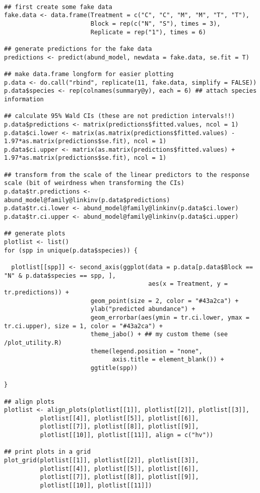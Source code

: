 \documentclass[11pt]{article}
\begin{document}
\begin{verbatim}

## first create some fake data
fake.data <- data.frame(Treatment = c("C", "C", "M", "M", "T", "T"),
                        Block = rep(c("N", "S"), times = 3),
                        Replicate = rep("1"), times = 6)

## generate predictions for the fake data
predictions <- predict(abund_model, newdata = fake.data, se.fit = T)

## make data.frame longform for easier plotting
p.data <- do.call("rbind", replicate(11, fake.data, simplify = FALSE))
p.data$species <- rep(colnames(summary@y), each = 6) ## attach species information

## calculate 95% Wald CIs (these are not prediction intervals!!)
p.data$predictions <- matrix(predictions$fitted.values, ncol = 1)
p.data$ci.lower <- matrix(as.matrix(predictions$fitted.values) - 1.97*as.matrix(predictions$se.fit), ncol = 1)
p.data$ci.upper <- matrix(as.matrix(predictions$fitted.values) + 1.97*as.matrix(predictions$se.fit), ncol = 1)

## transform from the scale of the linear predictors to the response scale (bit of weirdness when transforming the CIs)
p.data$tr.predictions <- abund_model@family@linkinv(p.data$predictions)
p.data$tr.ci.lower <- abund_model@family@linkinv(p.data$ci.lower)
p.data$tr.ci.upper <- abund_model@family@linkinv(p.data$ci.upper)

## generate plots
plotlist <- list()
for (spp in unique(p.data$species)) {

  plotlist[[spp]] <- second_axis(ggplot(data = p.data[p.data$Block == "N" & p.data$species == spp, ],
                                        aes(x = Treatment, y = tr.predictions)) +
                        geom_point(size = 2, color = "#43a2ca") +
                        ylab("predicted abundance") +
                        geom_errorbar(aes(ymin = tr.ci.lower, ymax = tr.ci.upper), size = 1, color = "#43a2ca") +
                        theme_jabo() + ## my custom theme (see /plot_utility.R)
                        theme(legend.position = "none",
                              axis.title = element_blank()) +
                        ggtitle(spp))

}

## align plots
plotlist <- align_plots(plotlist[[1]], plotlist[[2]], plotlist[[3]],
          plotlist[[4]], plotlist[[5]], plotlist[[6]],
          plotlist[[7]], plotlist[[8]], plotlist[[9]],
          plotlist[[10]], plotlist[[11]], align = c("hv"))

## print plots in a grid
plot_grid(plotlist[[1]], plotlist[[2]], plotlist[[3]],
          plotlist[[4]], plotlist[[5]], plotlist[[6]],
          plotlist[[7]], plotlist[[8]], plotlist[[9]],
          plotlist[[10]], plotlist[[11]])
\end{verbatim}
\end{document}
